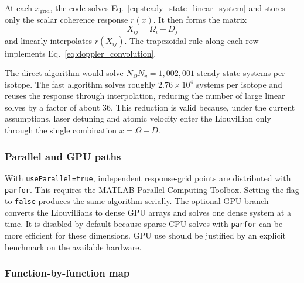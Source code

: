 At each \(x_{\mathrm{grid}}\), the code solves
Eq.~\eqref{eq:steady_state_linear_system} and stores only the scalar
coherence response \(r(x)\).  It then forms the matrix
\begin{equation}
X_{ij}=\Omega_i-D_j
\end{equation}
and linearly interpolates \(r(X_{ij})\).  The trapezoidal rule along each row
implements Eq.~\eqref{eq:doppler_convolution}.

The direct algorithm would solve
\(N_\Omega N_v=1{,}002{,}001\) steady-state systems per isotope.  The fast
algorithm solves roughly \(2.76\times10^4\) systems per isotope and reuses
the response through interpolation, reducing the number of large linear
solves by a factor of about \(36\).  This reduction is valid because, under
the current assumptions, laser detuning and atomic velocity enter the
Liouvillian only through the single combination \(x=\Omega-D\).

\subsubsection{Parallel and GPU paths}

With \texttt{useParallel=true}, independent response-grid points are
distributed with \texttt{parfor}.  This requires the MATLAB Parallel
Computing Toolbox.  Setting the flag to \texttt{false} produces the same
algorithm serially.  The optional GPU branch converts the Liouvillians to
dense GPU arrays and solves one dense system at a time.  It is disabled by
default because sparse CPU solves with \texttt{parfor} can be more efficient
for these dimensions.  GPU use should be justified by an explicit benchmark
on the available hardware.

\clearpage
\subsubsection{Function-by-function map}


